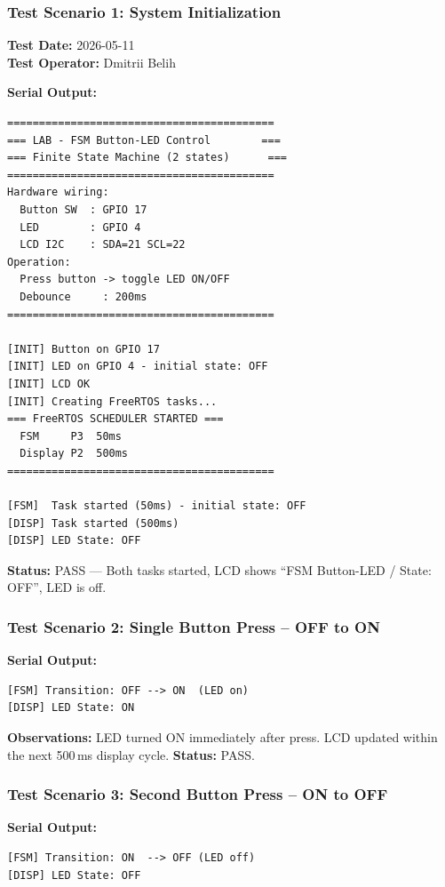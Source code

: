 \documentclass[12pt]{article}
\begin{document}
\subsubsection*{Test Scenario 1: System Initialization}

\textbf{Test Date:} 2026-05-11 \\
\textbf{Test Operator:} Dmitrii Belih

\textbf{Serial Output:}
\begin{verbatim}
==========================================
=== LAB - FSM Button-LED Control        ===
=== Finite State Machine (2 states)      ===
==========================================
Hardware wiring:
  Button SW  : GPIO 17
  LED        : GPIO 4
  LCD I2C    : SDA=21 SCL=22
Operation:
  Press button -> toggle LED ON/OFF
  Debounce     : 200ms
==========================================

[INIT] Button on GPIO 17
[INIT] LED on GPIO 4 - initial state: OFF
[INIT] LCD OK
[INIT] Creating FreeRTOS tasks...
=== FreeRTOS SCHEDULER STARTED ===
  FSM     P3  50ms
  Display P2  500ms
==========================================

[FSM]  Task started (50ms) - initial state: OFF
[DISP] Task started (500ms)
[DISP] LED State: OFF
\end{verbatim}

\textbf{Status:} PASS — Both tasks started, LCD shows ``FSM Button-LED / State: OFF'', LED is off.

\subsubsection*{Test Scenario 2: Single Button Press – OFF to ON}

\textbf{Serial Output:}
\begin{verbatim}
[FSM] Transition: OFF --> ON  (LED on)
[DISP] LED State: ON
\end{verbatim}

\textbf{Observations:} LED turned ON immediately after press. LCD updated within the next 500\,ms display cycle. \textbf{Status:} PASS.

\subsubsection*{Test Scenario 3: Second Button Press – ON to OFF}

\textbf{Serial Output:}
\begin{verbatim}
[FSM] Transition: ON  --> OFF (LED off)
[DISP] LED State: OFF
\end{verbatim}
\end{document}
